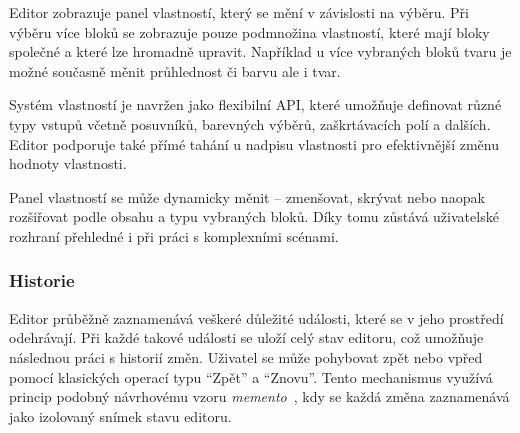 Editor zobrazuje panel vlastností, který se mění v závislosti na výběru. 
Při výběru více bloků se zobrazuje pouze podmnožina vlastností, které mají bloky společné a které lze hromadně upravit. 
Například u více vybraných bloků tvaru je možné současně měnit průhlednost či barvu ale i tvar.

Systém vlastností je navržen jako flexibilní API, které umožňuje definovat různé typy vstupů včetně posuvníků, barevných výběrů, zaškrtávacích polí a dalších. 
Editor podporuje také přímé tahání u nadpisu vlastnosti pro efektivnější změnu hodnoty vlastnosti.

Panel vlastností se může dynamicky měnit -- zmenšovat, skrývat nebo naopak rozšiřovat podle obsahu a typu vybraných bloků. 
Díky tomu zůstává uživatelské rozhraní přehledné i při práci s komplexními scénami.








\subsubsection{Historie}

Editor průběžně zaznamenává veškeré důležité události, které se v jeho prostředí odehrávají. 
Při každé takové události se uloží celý stav editoru, což umožňuje následnou práci s historií změn. 
Uživatel se může pohybovat zpět nebo vpřed pomocí klasických operací typu \enquote{Zpět} a \enquote{Znovu}. Tento mechanismus využívá princip podobný návrhovému vzoru \emph{memento}~, kdy se každá změna zaznamenává jako izolovaný snímek stavu editoru.


